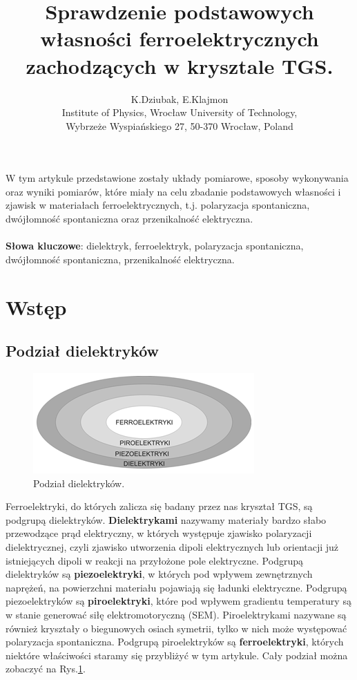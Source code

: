 \documentclass{article}
\begin{document}
\title{Sprawdzenie podstawowych własności ferroelektrycznych zachodzących w krysztale TGS.}
\date{}
\author{K.Dziubak, E.Klajmon\\Institute of Physics, Wrocław University of Technology, \\Wybrzeże
Wyspiańskiego 27, 50-370 Wrocław, Poland}
\maketitle
{}

W tym artykule przedstawione zostały układy pomiarowe, sposoby wykonywania oraz wyniki pomiarów, które miały na celu zbadanie podstawowych własności i zjawisk w materiałach ferroelektrycznych, t.j. polaryzacja spontaniczna, dwójłomność spontaniczna oraz przenikalność elektryczna.

\paragraph{}
\textbf{Słowa kluczowe}: dielektryk, ferroelektryk, polaryzacja spontaniczna, dwójłomność spontaniczna, przenikalność elektryczna.

\section{Wstęp}
\subsection{Podział dielektryków}
\begin{figure}[!h]
	\centering
	\includegraphics[width=0.7\linewidth]{podzial.png}
	\caption{Podział dielektryków.}
	\label{fig:podzial}
\end{figure}

Ferroelektryki, do których zalicza się badany przez nas kryształ TGS, są podgrupą dielektryków. \textbf{Dielektrykami} nazywamy materiały bardzo słabo przewodzące prąd elektryczny, w których występuje zjawisko polaryzacji dielektrycznej, czyli zjawisko utworzenia dipoli elektrycznych lub orientacji już istniejących dipoli w reakcji na przyłożone pole elektryczne. Podgrupą dielektryków są \textbf{piezoelektryki}, w których pod wpływem zewnętrznych naprężeń, na powierzchni materiału pojawiają się ładunki elektryczne. Podgrupą piezoelektryków są \textbf{piroelektryki}, które pod wpływem gradientu temperatury są w stanie generować siłę elektromotoryczną (SEM). Piroelektrykami nazywane są również kryształy o biegunowych osiach symetrii, tylko w nich może występować polaryzacja spontaniczna\cite{krajewski}. Podgrupą piroelektryków są \textbf{ferroelektryki}, których niektóre właściwości staramy się przybliżyć w tym artykule. Cały podział można zobaczyć na Rys.\ref{fig:podzial}.
\end{document}
